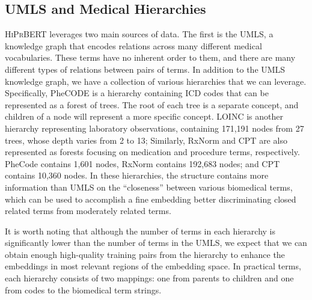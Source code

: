\documentclass[12pt,a4paper]{cibb}
\begin{document}
\subsection{UMLS and Medical Hierarchies}
\textsc{HiPrBERT} leverages two main sources of data. The first is the UMLS, a knowledge graph that encodes relations across many different medical vocabularies. These terms have no inherent order to them, and there are many different types of relations between pairs of terms. In addition to the UMLS knowledge graph, we have a collection of various hierarchies that we can leverage. Specifically, PheCODE is a hierarchy containing ICD codes that can be represented as a forest of trees. The root of each tree is a separate concept, and children of a node will represent a more specific concept. LOINC is another hierarchy representing laboratory observations, containing 171,191 nodes from 27 trees, whose depth varies from 2 to 13;  Similarly, RxNorm and CPT are also represented as forests focusing on medication and  procedure terms, respectively. PheCode contains 1,601 nodes, RxNorm contains 192,683 nodes; and CPT contains 10,360 nodes. In these hierarchies, the structure contains more information than UMLS on the ``closeness'' between various biomedical terms, which can be used to accomplish a fine embedding better discriminating closed related terms from moderately related terms. %


It is worth noting that although the number of terms in each hierarchy is significantly lower than the number of terms in the UMLS, we expect that we can obtain enough high-quality training pairs from the hierarchy to enhance the embeddings in most relevant regions of the embedding space. In practical terms, each hierarchy consists of two mappings: one from parents to children and one from codes to the biomedical term strings.
\end{document}
